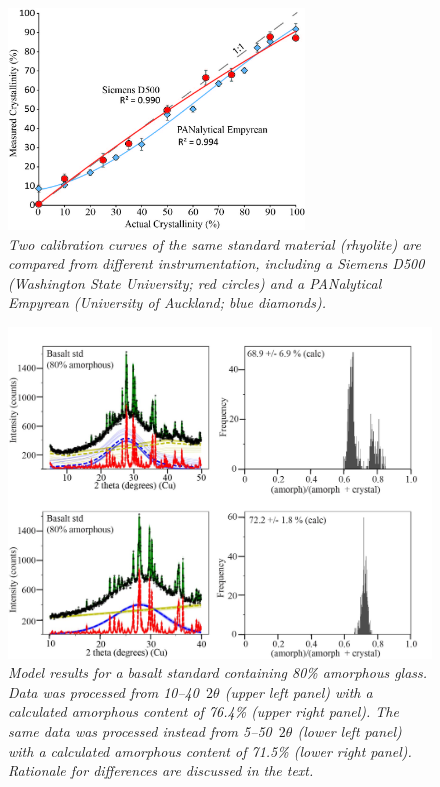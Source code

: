 \documentclass[review]{elsarticle}
\begin{document}
\begin{figure}[!ht]
\centering
\includegraphics[width=0.7\textwidth]{figures/instruments.jpg}
\caption{\it Two calibration curves of the same standard material (rhyolite) are compared from different instrumentation, including a Siemens D500 (Washington State University; red circles) and a PANalytical Empyrean (University of Auckland; blue diamonds).\label{fig:instruments}}
\end{figure}

\begin{figure}[!ht]
\centering
\includegraphics[width=1\textwidth]{figures/Outputs.jpg}
\caption{\it Model results for a basalt standard containing 80\% amorphous glass. Data was processed from 10--40\degree~$2\theta$ (upper left panel) with a calculated amorphous content of 76.4\% (upper right panel). The same data was processed instead from 5--50\degree~$2\theta$ (lower left panel) with a calculated amorphous content of 71.5\% (lower right panel). Rationale for differences are discussed in the text.\label{fig:Outputs}}
\end{figure}
\end{document}
